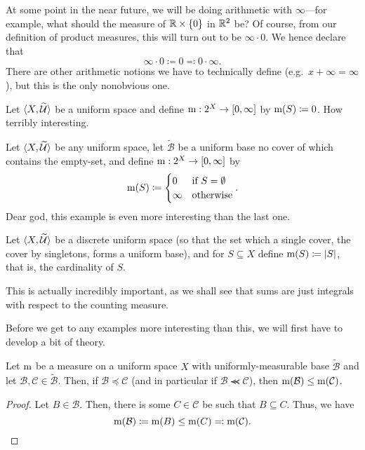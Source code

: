 \begin{displayquote}
At some point in the near future, we will be doing arithmetic with $\infty$---for example, what should the measure of $\mathbb{R} \times \{ 0\}$ in $\mathbb{R} ^2$ be?  Of course, from our definition of product measures, this will turn out to be $\infty \cdot 0$.  We hence declare that
\begin{equation}
\infty \cdot 0\coloneqq 0\eqqcolon 0\cdot \infty .
\end{equation}
There are other arithmetic notions we have to technically define (e.g.~$x+\infty=\infty$), but this is the only nonobvious one.
\end{displayquote}
\begin{exm}
Let $\langle X,\widetilde{\mathcal{U}}\rangle$ be a uniform space and define $\mathrm{m} :2^X\rightarrow [0,\infty ]$ by $\mathrm{m} (S)\coloneqq 0$.  How terribly interesting.
\end{exm}
\begin{exm}
Let $\langle X,\widetilde{\mathcal{U}}\rangle$ be any uniform space, let $\widetilde{\mathcal{B}}$ be a uniform base no cover of which contains the empty-set, and define $\mathrm{m} :2^X\rightarrow [0,\infty ]$ by
\begin{equation}
\mathrm{m} (S)\coloneqq \begin{cases}0 & \text{if }S=\emptyset \\ \infty & \text{otherwise}\end{cases}.
\end{equation}
Dear god, this example is even more interesting than the last one.
\end{exm}
\begin{exm}
Let $\langle X,\widetilde{\mathcal{U}}\rangle$ be a discrete uniform space (so that the set which a single cover, the cover by singletons, forms a uniform base), and for $S\subseteq X$ define $\mathrm{m} (S)\coloneqq \lvert S\rvert$, that is, the cardinality of $S$.
\begin{rmk}
This is actually incredibly important, as we shall see that sums are just integrals with respect to the counting measure.
\end{rmk}
\end{exm}
Before we get to any examples more interesting than this, we will first have to develop a bit of theory.
\begin{prp}\label{prp5.1.9}
Let $\mathrm{m}$ be a measure on a uniform space $X$ with uniformly-measurable base $\widetilde{\mathcal{B}}$ and let $\mathcal{B},\mathcal{C}\in \widetilde{\mathcal{B}}$.  Then, if $\mathcal{B}\preceq \mathcal{C}$ (and in particular if $\mathcal{B}\llcurly \mathcal{C}$), then $\mathrm{m} (\mathcal{B})\leq \mathrm{m} (\mathcal{C})$.
\begin{proof}
Let $B\in \mathcal{B}$.  Then, there is some $C\in \mathcal{C}$ be such that $B\subseteq C$.  Thus, we have
\begin{equation}
\mathrm{m} (\mathcal{B})\coloneqq \mathrm{m} (B)\leq \mathrm{m} (C)\eqqcolon \mathrm{m} (\mathcal{C}).
\end{equation}
\end{proof}
\end{prp}
